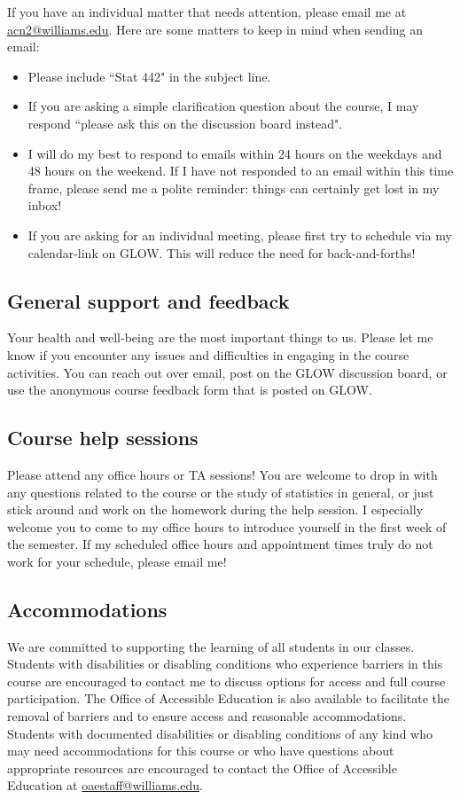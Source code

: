 \documentclass[11pt]{article}
\begin{document}
If you have an individual matter that needs attention, please email me at \url{acn2@williams.edu}. Here are some matters to keep in mind when sending an email:
\begin{itemize}
\item Please include ``Stat 442" in the subject line. 
\item If you are asking a simple clarification question about the course, I may respond ``please ask this on the discussion board instead". 
\item I will do my best to respond to emails within 24 hours on the weekdays and 48 hours on the weekend. If I have not responded to an email within this time frame, please send me a polite reminder: things can certainly get lost in my inbox! 
\item If you are asking for an individual meeting, please first try to schedule via my calendar-link on GLOW. This will reduce the need for back-and-forths! 
\end{itemize}

\subsection{General support and feedback}

Your health and well-being are the most important things to us. Please let me know if you encounter any issues and difficulties in engaging in the course activities. You can reach out over email, post on the GLOW discussion board, or use the anonymous course feedback form that is posted on GLOW. 

\subsection{Course help sessions}

Please attend any office hours or TA sessions! You are welcome to drop in with any questions related to the course or the study of statistics in general, or just stick around and work on the homework during the help session. I especially welcome you to come to my office hours to introduce yourself in the first week of the semester. If my scheduled office hours and appointment times truly do not work for your schedule, please email me! 

\subsection{Accommodations}
We are committed to supporting the learning of all students in our classes. Students with disabilities or disabling conditions who experience barriers in this course are encouraged to
contact me to discuss options for access and full course participation. The Office of Accessible Education is also available to facilitate the removal of barriers and to ensure access and reasonable accommodations. Students with documented disabilities or disabling conditions of any kind who may need accommodations
for this course or who have questions about appropriate resources are encouraged to contact the Office of Accessible Education at \url{oaestaff@williams.edu}.
\end{document}
